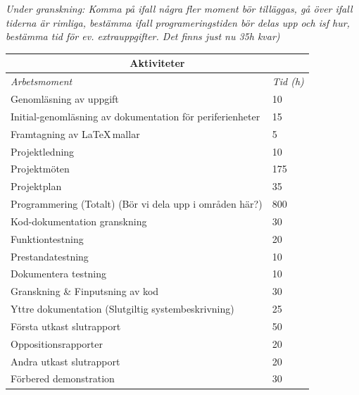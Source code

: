 \documentclass[a4paper]{article}
\begin{document}
\textit{Under granskning: Komma på ifall några fler moment bör tilläggas, gå över ifall tiderna är rimliga, bestämma ifall programeringstiden bör delas upp och isf hur, bestämma tid för ev. extrauppgifter. Det finns just nu 35h kvar)}
\begin{table}[b]
\begin{tabular}{|l|l|}
\hline
\multicolumn{2}{|c|}{\textbf{Aktiviteter}}                                   \\ \hline
\textit{Arbetsmoment}                                     & \textit{Tid (h)} \\ \hline
Genomläsning av uppgift                                   & 10               \\
Initial-genomläsning av dokumentation för periferienheter & 15               \\
Framtagning av \LaTeX \,mallar                            & 5                \\
Projektledning                                            & 10               \\
Projektmöten                                              & 175              \\
Projektplan                                               & 35               \\
Programmering (Totalt) (Bör vi dela upp i områden här?)   & 800              \\
Kod-dokumentation granskning                              & 30               \\
Funktiontestning                                          & 20               \\
Prestandatestning                                         & 10               \\
Dokumentera testning                                      & 10               \\
Granskning \& Finputsning av kod                          & 30               \\
Yttre dokumentation (Slutgiltig systembeskrivning)        & 25               \\
Första utkast slutrapport                                 & 50               \\
Oppositionsrapporter                                      & 20               \\
Andra utkast slutrapport                                  & 20               \\
Förbered demonstration                                    & 30               \\

\end{tabular}
\end{table}
\end{document}
